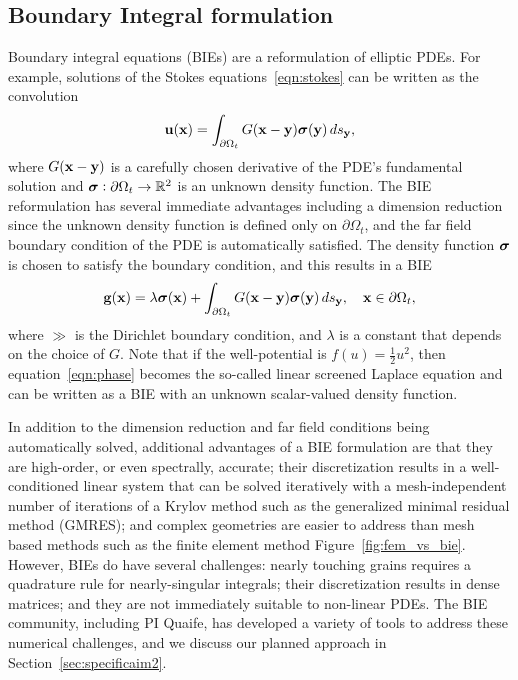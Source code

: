 \subsection{Boundary Integral formulation}
Boundary integral equations (BIEs) are a reformulation of elliptic PDEs.
For example, solutions of the Stokes equations~\eqref{eqn:stokes} can be
written as the convolution 
\begin{align*}
  \mathbf{u}(\mathbf{x}) = \int_{\partial\Omega_t} G(\mathbf{x} - \mathbf{y}) \boldsymbol{\sigma}(\mathbf{y}) \, ds_{\mathbf{y}},
\end{align*}
where $G(\mathbf{x} - \mathbf{y})$ is a carefully chosen derivative of the PDE's
fundamental solution and $\boldsymbol{\sigma}: \partial \Omega_t \rightarrow \mathbb{R}^2$
is an unknown density function. The BIE reformulation has several
immediate advantages including a dimension reduction since the unknown
density function is defined only on $\partial \Omega_t$, and the far
field boundary condition of the PDE is automatically satisfied. The
density function $\boldsymbol{\sigma}$ is chosen to satisfy the boundary condition,
and this results in a BIE 
\begin{align*}
  \mathbf{g}(\mathbf{x}) = \lambda \boldsymbol{\sigma}(\mathbf{x}) + 
    \int_{\partial\Omega_t} G(\mathbf{x} - \mathbf{y}) \boldsymbol{\sigma}(\mathbf{y}) \, ds_{\mathbf{y}},
    \quad \mathbf{x} \in \partial\Omega_t,
\end{align*}
where $\gg$ is the Dirichlet boundary condition, and $\lambda$ is a
constant that depends on the choice of $G$. Note that if the
well-potential is $f(u) = \tfrac{1}{2}u^2$, then
equation~\eqref{eqn:phase} becomes the so-called linear screened Laplace
equation and can be written as a BIE with an unknown scalar-valued
density function.

In addition to the dimension reduction and far field conditions being
automatically solved, additional advantages of a BIE formulation are
that they are high-order, or even spectrally, accurate; their
discretization results in a well-conditioned linear system that can be
solved iteratively with a mesh-independent number of iterations of a
Krylov method such as the generalized minimal residual method (GMRES);
and complex geometries are easier to address than mesh based methods
such as the finite element method Figure~\ref{fig:fem_vs_bie}. However,
BIEs do have several challenges: nearly touching grains requires a
quadrature rule for nearly-singular integrals; their discretization
results in dense matrices; and they are not immediately suitable to
non-linear PDEs. The BIE community, including PI Quaife, has developed a
variety of tools to address these numerical challenges, and we discuss
our planned approach in Section~\ref{sec:specificaim2}.

